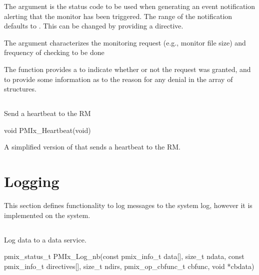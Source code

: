The  argument is the status code to be used when generating an event notification alerting that the monitor has been triggered.
The range of the notification defaults to .
This can be changed by providing a  directive.

The  argument characterizes the monitoring request (e.g., monitor file size) and frequency of checking to be done

The  function provides a  to indicate whether or not the request was granted, and to provide some information as to the reason for any denial in the  array of  structures.


\subsection{}

\summary

Send a heartbeat to the \ac{RM}

\format

\cspecificstart
\begin{codepar}
void PMIx_Heartbeat(void)
\end{codepar}
\cspecificend


\descr

A simplified version of  that sends a heartbeat to the \ac{RM}.


\section{Logging}
\label{chap:api_job_mgmt:logging}

This section defines functionality to log messages to the system log, however it is implemented on the system.

\subsection{}

\summary

Log data to a data service.

\format

\cspecificstart
\begin{codepar}
pmix_status_t
PMIx_Log_nb(const pmix_info_t data[], size_t ndata,
            const pmix_info_t directives[], size_t ndirs,
            pmix_op_cbfunc_t cbfunc, void *cbdata)
\end{codepar}
\cspecificend

